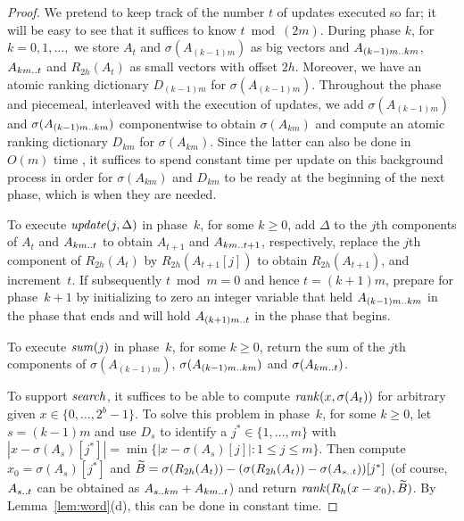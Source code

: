 \documentclass[envcountsame,envcountsect,undated,nolinenumbers]{lnthi}
\def\Tvn#1{\hbox{\textit{#1\/}}}
\def\Ttwodots{\mathinner{\ldotp\ldotp}}\def\Tsup#1{^{\mbox{\scriptsize #1}}}\gdef\Tsub#1{_{\mbox{\scriptsize #1}}}\def\cchoice{\overline{\Tvn{choice}}}
\def\Trho{R}
\begin{document}
\begin{proof}
We pretend to keep track of the number $t$
of updates executed so far;
it will be easy to see that it suffices
to know $t\bmod(2 m)$.
During phase $k$, for $k=0,1,\ldots,$
we store $A_t$ and $\sigma(A_{(k-1)m})$
as big vectors and
$A_{(k-1)m\Ttwodots k m}$,
$A_{k m\Ttwodots t}$ and
$\Trho_{2 h}(A_t)$ as small vectors with offset $2 h$.
Moreover, we have an atomic ranking dictionary
$D_{(k-1)m}$ for $\sigma(A_{(k-1)m})$.
Throughout the phase and piecemeal, interleaved with
the execution of updates, we add
$\sigma(A_{(k-1)m})$ and
$\sigma(A_{(k-1)m\Ttwodots k m})$
componentwise to obtain $\sigma(A_{k m})$
and compute an atomic ranking dictionary $D_{k m}$ for
$\sigma(A_{k m})$.
Since the latter can also be done in $O(m)$
time \cite[Corollary~8]{Hag98}, it suffices
to spend constant time per update on
this background process in order for
$\sigma(A_{k m})$ and $D_{k m}$
to be ready at the beginning of the next phase,
which is when they are needed.

To execute $\Tvn{update}(j,\Delta)$
in phase~$k$, for some $k\ge 0$,
add $\Delta$ to the $j$th components of
$A_t$ and $A_{k m\Ttwodots t}$ to obtain $A_{t+1}$
and $A_{k m\Ttwodots t+1}$, respectively,
replace the $j$th component of
$\Trho_{2 h}(A_t)$ by $\Trho_{2 h}(A_{t+1}[j])$
to obtain $\Trho_{2 h}(A_{t+1})$, and increment~$t$.
If subsequently $t\bmod m=0$ and hence $t=(k+1)m$,
prepare for phase~$k+1$ by initializing to zero
an integer variable that held $A_{(k-1)m\Ttwodots k m}$
in the phase that ends and will hold
$A_{(k+1)m\Ttwodots t}$ in the phase
that begins.

To execute $\Tvn{sum}(j)$ in phase~$k$, for some $k\ge 0$,
return the sum of the $j$th components
of $\sigma(A_{(k-1)m})$,
$\sigma(A_{(k-1)m\Ttwodots k m})$ and
$\sigma(A_{k m\Ttwodots t})$.

To support $\Tvn{search}$, it suffices to be able
to compute $\Tvn{rank}(x,\sigma(A_t))$ for arbitrary given
$x\in\{0,\ldots,2^b-1\}$.
To solve this problem
in phase~$k$, for some $k\ge 0$, let $s=(k-1)m$ and
use $D_s$ to identify a $j^*\in\{1,\ldots,m\}$
with $|x-\sigma(A_s)[j^*]|=\min\{|x-\sigma(A_s)[j]|:1\le j\le m\}$.
Then compute $x_0=\sigma(A_s)[j^*]$ and
$\widetilde{B}=
 \sigma(\Trho_{2 h}(A_t))
 -(\sigma(\Trho_{2 h}(A_t))-\sigma(A_{s\Ttwodots t}))[j^*]$
(of course, $A_{s\Ttwodots t}$ can be obtained as
$A_{s\Ttwodots k m}+A_{k m\Ttwodots t}$)
and return $\Tvn{rank}(\Trho_h(x-x_0),\widetilde{B})$.
By Lemma~\ref{lem:word}(d),
this can be done in constant time.


\end{proof}
\end{document}

